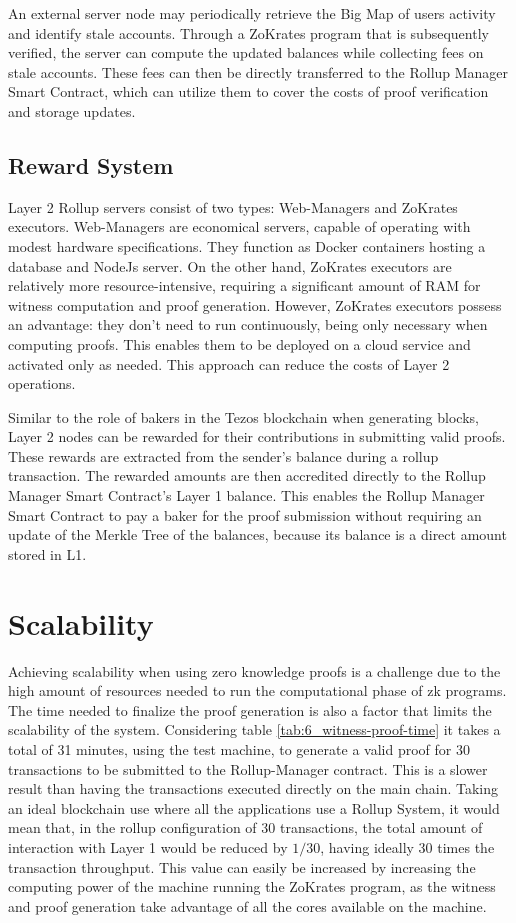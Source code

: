 An external server node may periodically retrieve the Big Map of users activity and identify stale accounts. Through a ZoKrates program that is subsequently verified, the server can compute the updated balances while collecting fees on stale accounts. These fees can then be directly transferred to the Rollup Manager Smart Contract, which can utilize them to cover the costs of proof verification and storage updates.

\subsection{Reward System}

Layer 2 Rollup servers consist of two types: Web-Managers and ZoKrates executors. Web-Managers are economical servers, capable of operating with modest hardware specifications. They function as Docker containers hosting a database and NodeJs server. On the other hand, ZoKrates executors are relatively more resource-intensive, requiring a significant amount of RAM for witness computation and proof generation. However, ZoKrates executors possess an advantage: they don't need to run continuously, being only necessary when computing proofs. This enables them to be deployed on a cloud service and activated only as needed. This approach can reduce the costs of Layer 2 operations.

Similar to the role of bakers in the Tezos blockchain when generating blocks, Layer 2 nodes can be rewarded for their contributions in submitting valid proofs. These rewards are extracted from the sender's balance during a rollup transaction. The rewarded amounts are then accredited directly to the Rollup Manager Smart Contract's Layer 1 balance. This enables the Rollup Manager Smart Contract to pay a baker for the proof submission without requiring an update of the Merkle Tree of the balances, because its balance is a direct amount stored in L1.

\section{Scalability}

Achieving scalability when using zero knowledge proofs is a challenge due to the high amount of resources needed to run the computational phase of zk programs. The time needed to finalize the proof generation is also a factor that limits the scalability of the system. Considering table \ref{tab:6_witness-proof-time} it takes a total of 31 minutes, using the test machine, to generate a valid proof for 30 transactions to be submitted to the Rollup-Manager contract. This is a slower result than having the transactions executed directly on the main chain. Taking an ideal blockchain use where all the applications use a Rollup System, it would mean that, in the rollup configuration of 30 transactions, the total amount of interaction with Layer 1 would be reduced by $1/30$, having ideally 30 times the transaction throughput. This value can easily be increased by increasing the computing power of the machine running the ZoKrates program, as the witness and proof generation take advantage of all the cores available on the machine.

